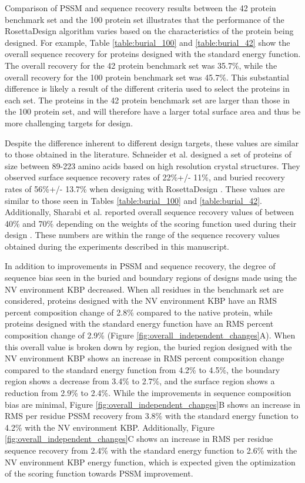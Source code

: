 Comparison of PSSM and sequence recovery results between the 42 protein benchmark set and the 100 protein set illustrates that the performance of the RosettaDesign algorithm varies based on the characteristics of the protein being designed.
For example, Table \ref{table:burial_100} and \ref{table:burial_42} show the overall sequence recovery for proteins designed with the standard energy function.
The overall recovery for the 42 protein benchmark set was 35.7\%, while the overall recovery for the 100 protein benchmark set was 45.7\%.
This substantial difference is likely a result of the different criteria used to select the proteins in each set.
The proteins in the 42 protein benchmark set are larger than those in the 100 protein set, and will therefore have a larger total surface area and thus be more challenging targets for design.

Despite the difference inherent to different design targets, these values are similar to those obtained in the literature.
Schneider et al. designed a set of proteins of size between 89-223 amino acids based on high resolution crystal structures.
They observed surface sequence recovery rates of 22\%+/- 11\%, and buried recovery rates of 56\%+/- 13.7\% when designing with RosettaDesign \citep{Schneider:2009ig}.
These values are similar to those seen in Tables \ref{table:burial_100} and \ref{table:burial_42}.
Additionally, Sharabi et al. reported overall sequence recovery values of between 40\% and 70\% depending on the weights of the scoring function used during their design \citep{Sharabi:2011ev}.
These numbers are within the range of the sequence recovery values obtained during the experiments described in this manuscript.

In addition to improvements in PSSM and sequence recovery, the degree of sequence bias seen in the buried and boundary regions of designs made using the NV environment KBP decreased.
When all residues in the benchmark set are considered, proteins designed with the NV environment KBP have an RMS percent composition change of 2.8\% compared to the native protein, while proteins designed with the standard energy function have an RMS percent composition change of 2.9\% (Figure \ref{fig:overall_independent_changes}A).
When this overall value is broken down by region, the buried region designed with the NV environment KBP shows an increase in RMS percent composition change compared to the standard energy function from 4.2\% to 4.5\%, the boundary region shows a decrease from 3.4\% to 2.7\%, and the surface region shows a reduction from 2.9\% to 2.4\%.
While the improvements in sequence composition bias are minimal, Figure \ref{fig:overall_independent_changes}B shows an increase in RMS per residue PSSM recovery from 3.8\% with the standard energy function to 4.2\% with the NV environment KBP.
Additionally, Figure \ref{fig:overall_independent_changes}C shows an increase in RMS per residue sequence recovery from 2.4\% with the standard energy function to 2.6\% with the NV environment KBP energy function, which is expected given the optimization of the scoring function towards PSSM improvement. 

